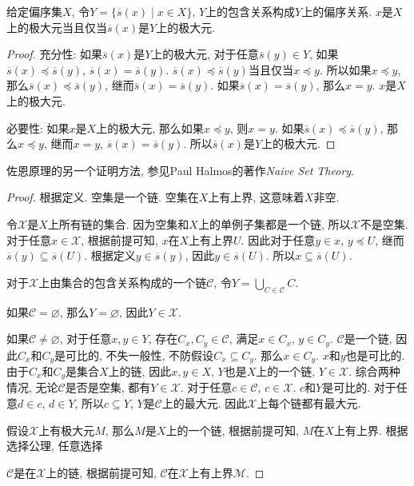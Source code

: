 \begin{proposition}
	给定偏序集$X$, 令$Y=\{\overline s(x)\mid x\in X\}$, $Y$上的包含关系构成$Y$上的偏序关系.
	$x$是$X$上的极大元当且仅当$\overline s(x)$是$Y$上的极大元.
\end{proposition}

\begin{proof}
	充分性: 如果$\overline s(x)$是$Y$上的极大元, 对于任意$\overline s(y)\in Y$, 如果$\overline s(x)\preccurlyeq \overline s(y)$, $\overline s(x)=\overline s(y)$. $\overline s(x)\preccurlyeq \overline s(y)$当且仅当$x\preccurlyeq y$. 所以如果$x\preccurlyeq y$, 那么$\overline s(x)\preccurlyeq \overline s(y)$, 继而$\overline s(x)=\overline s(y)$. 如果$\overline s(x)=\overline s(y)$, 那么$x=y$. $x$是$X$上的极大元.
	
	必要性: 如果$x$是$X$上的极大元, 那么如果$x\preccurlyeq y$, 则$x=y$. 如果$\overline s(x)\preccurlyeq \overline s(y)$, 那么$x\preccurlyeq y$, 继而$x=y$, $\overline s(x)=\overline s(y)$. 所以$\overline s(x)$是$Y$上的极大元.
\end{proof}

佐恩原理的另一个证明方法, 参见Paul Halmos的著作\emph{Naive Set Theory}.

\begin{proof}
	根据定义. 空集是一个链. 空集在$X$上有上界, 这意味着$X$非空.
	
	令$\mathscr X$是$X$上所有链的集合. 因为空集和$X$上的单例子集都是一个链, 所以$\mathscr X$不是空集. 对于任意$x\in \mathscr X$, 根据前提可知, $x$在$X$上有上界$U$. 因此对于任意$y\in x$, $y\preccurlyeq U$, 继而$\overline s(y)\subseteq \overline s(U)$. 根据定义$y\in \overline s(y)$, 因此$y\in \overline s(U)$. 所以$x\subseteq \overline s(U)$.
	
	对于$\mathscr X$上由集合的包含关系构成的一个链$\mathscr C$, 令$Y=\bigcup_{C\in \mathscr C} C$.
	
	如果$\mathscr C=\varnothing$, 那么$Y=\varnothing$, 因此$Y\in \mathscr X$.
	
	如果$\mathscr C\neq \varnothing$, 对于任意$x,y\in Y$, 存在$C_x,C_y\in \mathscr C$, 满足$x\in C_x$, $y\in C_y$. $\mathscr C$是一个链, 因此$C_x$和$C_y$是可比的, 不失一般性, 不防假设$C_x\subseteq C_y$. 那么$x\in C_y$. $x$和$y$也是可比的. 由于$C_x$和$C_y$是集合$X$上的链, 因此$x,y\in X$, $Y$也是$X$上的一个链, $Y\in \mathscr X$. 综合两种情况, 无论$\mathscr C$是否是空集, 都有$Y\in \mathscr X$. 对于任意$c\in \mathscr C$, $c\in \mathscr X$. $c$和$Y$是可比的. 对于任意$d\in c$, $d\in Y$, 所以$c\subseteq Y$, $Y$是$\mathscr C$上的最大元. 因此$\mathscr X$上每个链都有最大元.
	
	假设$\mathscr X$上有极大元$M$, 那么$M$是$X$上的一个链, 根据前提可知, $M$在$X$上有上界. 根据选择公理, 任意选择
	
	$\mathscr C$是在$\mathscr X$上的链, 根据前提可知, $\mathscr C$在$\mathscr X$上有上界$\mathscr M$.
\end{proof}

